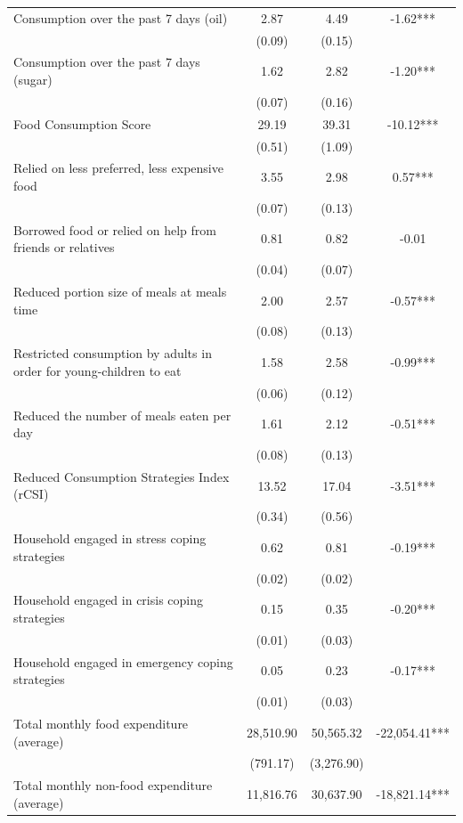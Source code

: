 \begin{tabular}{@{\extracolsep{5pt}}lccc}
Consumption over the past 7 days (oil)   & 2.87    & 4.49    & -1.62***   \\
 & (0.09)  & (0.15)  &  \\ [1ex]
Consumption over the past 7 days (sugar)   & 1.62    & 2.82    & -1.20***   \\
 & (0.07)  & (0.16)  &  \\ [1ex]
Food Consumption Score   & 29.19    & 39.31    & -10.12***   \\
 & (0.51)  & (1.09)  &  \\ [1ex]
Relied on less preferred, less expensive food   & 3.55    & 2.98    & 0.57***   \\
 & (0.07)  & (0.13)  &  \\ [1ex]
Borrowed food or relied on help from friends or relatives   & 0.81    & 0.82    & -0.01   \\
 & (0.04)  & (0.07)  &  \\ [1ex]
Reduced portion size of meals at meals time   & 2.00    & 2.57    & -0.57***   \\
 & (0.08)  & (0.13)  &  \\ [1ex]
Restricted consumption by adults in order for young-children to eat   & 1.58    & 2.58    & -0.99***   \\
 & (0.06)  & (0.12)  &  \\ [1ex]
Reduced the number of meals eaten per day   & 1.61    & 2.12    & -0.51***   \\
 & (0.08)  & (0.13)  &  \\ [1ex]
Reduced Consumption Strategies Index (rCSI)   & 13.52    & 17.04    & -3.51***   \\
 & (0.34)  & (0.56)  &  \\ [1ex]
Household engaged in stress coping strategies   & 0.62    & 0.81    & -0.19***   \\
 & (0.02)  & (0.02)  &  \\ [1ex]
Household engaged in crisis coping strategies   & 0.15    & 0.35    & -0.20***   \\
 & (0.01)  & (0.03)  &  \\ [1ex]
Household engaged in emergency coping strategies   & 0.05    & 0.23    & -0.17***   \\
 & (0.01)  & (0.03)  &  \\ [1ex]
Total monthly food expenditure (average)   & 28,510.90    & 50,565.32    & -22,054.41***   \\
 & (791.17)  & (3,276.90)  &  \\ [1ex]
Total monthly non-food expenditure (average)   & 11,816.76    & 30,637.90    & -18,821.14***   \\

\end{tabular}
